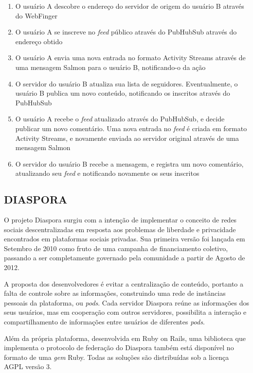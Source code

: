 \begin{enumerate}
  \item{O usuário A descobre o endereço do servidor de origem do usuário B através
        do WebFinger}
  \item{O usuário A se inscreve no \textit{feed} público através do PubHubSub
        através do endereço obtido}
  \item{O usuário A envia uma nova entrada no formato Activity Streams através de
        uma mensagem Salmon para o usuário B, notificando-o da ação}
  \item{O servidor do usuário B atualiza sua lista de seguidores. Eventualmente, o
        usuário B publica um novo conteúdo, notificando os inscritos através do
        PubHubSub}
  \item{O usuário A recebe o \textit{feed} atualizado através do PubHubSub, e decide
        publicar um novo comentário. Uma nova entrada no \textit{feed} é criada em
        formato Activity Streams, e novamente enviada ao servidor original através
        de uma mensagem Salmon}
  \item{O servidor do usuário B recebe a mensagem, e registra um novo comentário,
        atualizando seu \textit{feed} e notificando novamente os seus inscritos}
\end{enumerate}


\subsection{DIASPORA}

O projeto Diaspora surgiu com a intenção de implementar o conceito de redes sociais
descentralizadas em resposta aos problemas de liberdade e privacidade encontrados em
plataformas sociais privadas. Sua primeira versão foi lançada em Setembro de 2010
como fruto de uma campanha de financiamento coletivo, passando a ser completamente
governado pela comunidade a partir de Agosto de 2012.


A proposta dos desenvolvedores é evitar a centralização de conteúdo, portanto a falta
de controle sobre as informações, construindo uma rede de instâncias pessoais da
plataforma, ou \textit{pods}. Cada servidor Diaspora reúne as informações dos seus
usuários, mas em cooperação com outros servidores, possibilita a interação e
compartilhamento de informações entre usuários de diferentes \textit{pods}.

Além da própria plataforma, desenvolvida em Ruby on Rails, uma biblioteca que
implementa o protocolo de federação do Diaspora também está disponível no formato de
uma \textit{gem} Ruby. Todas as soluções são distribuídas sob a licença AGPL versão
3. 

